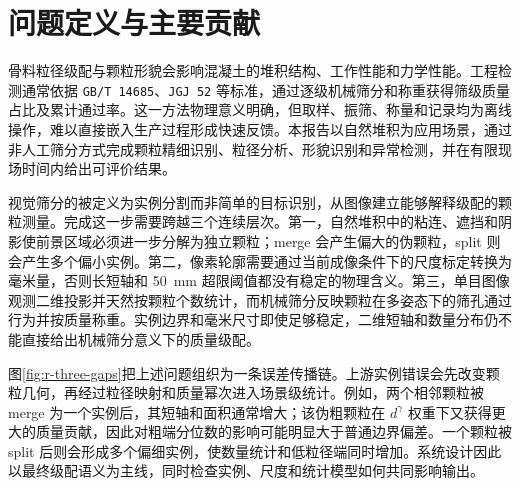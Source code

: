 \section{问题定义与主要贡献}
\label{sec:r-problem}

骨料粒径级配与颗粒形貌会影响混凝土的堆积结构、工作性能和力学性能。工程检测通常依据 \texttt{GB/T 14685}、\texttt{JGJ 52} 等标准，通过逐级机械筛分和称重获得筛级质量占比及累计通过率\cite{gb14685-2022,jgj52-2006}。这一方法物理意义明确，但取样、振筛、称量和记录均为离线操作，难以直接嵌入生产过程形成快速反馈。本报告以自然堆积为应用场景，通过非人工筛分方式完成颗粒精细识别、粒径分析、形貌识别和异常检测，并在有限现场时间内给出可评价结果。

视觉筛分的被定义为实例分割而非简单的目标识别，从图像建立能够解释级配的颗粒测量。完成这一步需要跨越三个连续层次。第一，自然堆积中的粘连、遮挡和阴影使前景区域必须进一步分解为独立颗粒；merge 会产生偏大的伪颗粒，split 则会产生多个偏小实例。第二，像素轮廓需要通过当前成像条件下的尺度标定转换为毫米量，否则长短轴和 50~mm 超限阈值都没有稳定的物理含义。第三，单目图像观测二维投影并天然按颗粒个数统计，而机械筛分反映颗粒在多姿态下的筛孔通过行为并按质量称重。实例边界和毫米尺寸即使足够稳定，二维短轴和数量分布仍不能直接给出机械筛分意义下的质量级配。

图\ref{fig:r-three-gaps}把上述问题组织为一条误差传播链。上游实例错误会先改变颗粒几何，再经过粒径映射和质量幂次进入场景级统计。例如，两个相邻颗粒被 merge 为一个实例后，其短轴和面积通常增大；该伪粗颗粒在 $d^\gamma$ 权重下又获得更大的质量贡献，因此对粗端分位数的影响可能明显大于普通边界偏差。一个颗粒被 split 后则会形成多个偏细实例，使数量统计和低粒径端同时增加。系统设计因此以最终级配语义为主线，同时检查实例、尺度和统计模型如何共同影响输出。

